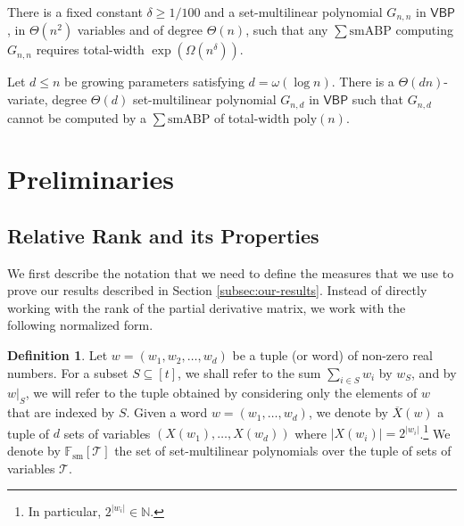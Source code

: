 \documentclass[10pt,a4paper]{article}
\newenvironment{manualtheorem}[1]{%
  \renewcommand\themanualtheoreminner{#1}%
  \manualtheoreminner
}{\endmanualtheoreminner}
\theoremstyle{definition}%
\newtheorem{definition}[theorem]{Definition}
\theoremstyle{plain}
\newcommand{\sbp}{\sum\mathrm{smABP}}
\newcommand{\poly}{\mathrm{poly}}
\newcommand{\VBP}{\mathsf{VBP}}
\newcommand{\Fsm}{\mathbb{F}_{\mathrm{sm}}}
\newcommand{\ol}[1]{\overline{#1}}
\newcommand{\calT}{\mathcal{T}}
\begin{document}
\begin{manualtheorem}{\ref{thm:large-deg-VP}'}\label{thm:large-deg-VBP}
    There is a fixed constant $\delta \geq 1/100$ and a set-multilinear polynomial $G_{n,n}$ in $\VBP$, in  $\Theta(n^2)$ variables and of degree $\Theta(n)$,  such that any $\sbp$ computing $G_{n,n}$ requires total-width ${\exp(\Omega(n^{\delta}))}$.
\end{manualtheorem}

\begin{manualtheorem}{\ref{thm:small-deg-VP}'}\label{thm:small-deg-VBP}
Let $d\leq n$ be growing parameters satisfying $d = \omega(\log n)$. There is a  $\Theta(dn)$-variate, degree $\Theta(d)$ set-multilinear polynomial $G_{n,d}$ in $\VBP$ such that $G_{n,d}$  cannot be computed by a $\sbp$ of total-width $\poly(n)$.
\end{manualtheorem}

\section{Preliminaries}\label{sec:prel}
\subsection{Relative Rank and its Properties}

We first describe the notation that we need to define the measures that we use to prove our results described in Section \ref{subsec:our-results}. Instead of directly working with the rank of the partial derivative matrix, we work with the following normalized form.

\begin{definition}\label{def:rk-rest}
Let $w = (w_1, w_2,\ldots, w_d)$ be a tuple (or word) of non-zero real numbers. For a subset $S \subseteq [t]$, we shall refer to the sum $\sum_{i\in S} w_i$ by $w_S$,  and by $w|_S$, we will refer to the tuple obtained by considering only the
elements of $w$ that are indexed by $S$. 
Given a word $w=(w_1,\ldots,w_d)$, we denote by $\ol{X}(w)$ a tuple of $d$ sets of variables $(X(w_1),\ldots,X(w_d))$ where
$|X(w_i)| = 2^{|w_i|}$.\footnote{In particular, $2^{|w_i|}\in\mathbb{N}$.}
We denote by $\Fsm[\calT]$ the set of set-multilinear polynomials over the tuple
of sets of variables $\calT$.
\end{definition}
\end{document}
